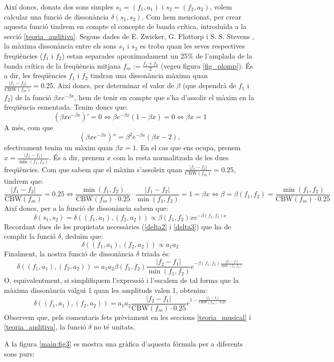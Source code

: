 \documentclass{article}
\theoremstyle{math}
\theoremstyle{TheoremNum}
\newcommand{\0}{\ensuremath{\vb{0}}}
\begin{document}
Així doncs, donats dos sons simples $s_1=(f_1,a_1)$ i $s_2=(f_2,a_2)$, volem calcular una funció de dissonància $\delta(s_1,s_2)$. Com hem mencionat, per crear aquesta funció tindrem en compte el concepte de banda crítica, introduïda a la secció \ref{teoria_auditiva}. Segons dades de E. Zwicker, G. Flottorp i S. S. Stevens \cite{zwicker}, la màxima dissonància entre els sons $s_1$ i $s_2$ es troba quan les seves respectives freqüències ($f_1$ i $f_2$) estan separades aproximadament un 25\% de l'amplada de la banda crítica de la freqüència mitjana $f_m:=\frac{f_1+f_2}{2}$ (vegeu figura \ref{fig_plomp}). És a dir, les freqüències $f_1$ i $f_2$ tindran una dissonància màxima quan $\frac{|f_1-f_2|}{\text{CBW}(f_m)}=0.25$. Així doncs, per determinar el valor de $\beta$ (que dependrà de $f_1$ i $f_2$) de la funció $\beta xe^{-\beta x}$, hem de tenir en compte que s'ha d'assolir el màxim en la freqüència esmentada. Tenim doncs que:
$$\left(\beta xe^{-\beta x}\right)'=0\iff \beta e^{-\beta x}(1-\beta x)=0\iff\beta x=1$$ A més, com que $$\left(\beta xe^{-\beta x}\right)''=\beta^2e^{-\beta x}(\beta x-2),$$ efectivament tenim un màxim quan $\beta x=1$.
En el cas que ens ocupa, prenem $x=\frac{|f_2-f_1|}{\min(f_1,f_2)}$. És a dir, prenem $x$ com la resta normalitzada de les dues freqüències. Com que sabem que el màxim s'assoleix quan $\frac{|f_1-f_2|}{\text{CBW}(f_m)}=0.25$, tindrem que:
$$\frac{|f_1-f_2|}{\text{CBW}(f_m)}=0.25\iff\frac{\min(f_1, f_2)}{\text{CBW}(f_m)\cdot 0.25}\cdot\frac{|f_1-f_2|}{\min(f_1, f_2)}=1=\beta x\iff\beta=\beta(f_1,f_2)=\frac{\min(f_1, f_2)}{\text{CBW}(f_m)\cdot 0.25}$$
Així doncs, per a la funció de dissonància sabem que: $$\delta(s_1,s_2)=\delta((f_1,a_1),(f_2,a_2))\propto\beta(f_1,f_2)xe^{-\beta(f_1,f_2)x}$$ Recordant dues de les propietats necessàries (\ref{delta2} i \ref{delta3}) que ha de complir la funció $\delta$, deduïm que: $$\delta((f_1,a_1),(f_2,a_2))\propto a_1a_2$$ Finalment, la nostra funció de dissonància $\delta$ triada és: $$\delta((f_1,a_1),(f_2,a_2))=a_1a_2\beta(f_1,f_2)\frac{|f_2-f_1|}{\min(f_1,f_2)}e^{-\beta(f_1,f_2)\frac{|f_2-f_1|}{\min(f_1,f_2)}}$$
O, equivalentment, si simplifiquem l'expressió i l'escalem de tal forma que la màxima dissonància valgui 1 quan les amplituds valen 1, obtenim:
\begin{equation}
  \delta((f_1,a_1),(f_2,a_2))=a_1a_2\frac{|f_2-f_1|}{\text{CBW}(f_m)\cdot 0.25}e^{1-\frac{|f_2-f_1|}{\text{CBW}(f_m)\cdot 0.25}}
  \label{for:dissonancia}
\end{equation}
Observem que, pels comentaris fets prèviament en les seccions \ref{teoria_musical} i \ref{teoria_auditiva}, la funció $\delta$ no té unitats.\par\noindent A la figura \ref{main:fig3} es mostra una gràfica d'aquesta fórmula per a diferents sons purs:
\begin{center}
  
  \label{main:fig3}
\end{center}
\end{document}
